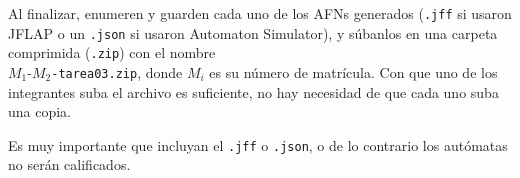 \documentclass[]{book}
\theoremstyle{definition}
\begin{document}
Al finalizar, enumeren y guarden cada uno de los AFNs generados (\texttt{.jff} si usaron JFLAP o un \texttt{.json} si usaron Automaton Simulator), y súbanlos en una carpeta comprimida (\texttt{.zip}) con el nombre\\$M_1$-$M_2$\texttt{-tarea03.zip}, donde $M_i$ es su número de matrícula.
Con que uno de los integrantes suba el archivo es suficiente, no hay necesidad de que cada uno suba una copia.

Es muy importante que incluyan el \texttt{.jff} o \texttt{.json}, o de lo contrario los autómatas no serán calificados.
\end{document}
